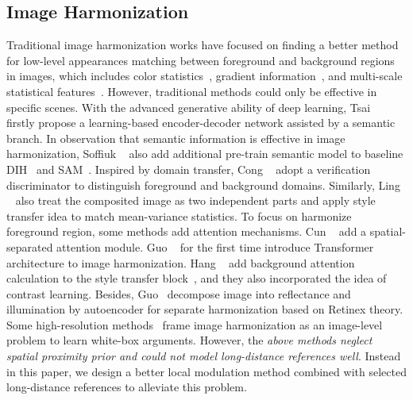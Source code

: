 \documentclass[10pt,twocolumn,letterpaper]{article}
\begin{document}
\subsection{Image Harmonization} Traditional image harmonization works have focused on finding a better method for low-level appearances matching between foreground and background regions in images, which includes color statistics~\cite{reinhard2001color,pitie2007linear,xue2012understanding},  gradient information~\cite{jia2006drag,perez2003poisson,tao2010error}, and multi-scale statistical features~\cite{sunkavalli2010multi,lalonde2007using}. However, traditional methods could only be effective in specific scenes. With the advanced generative ability of deep learning, Tsai \etal~\cite{Tsai_2017_CVPR} firstly propose a learning-based encoder-decoder network assisted by a semantic branch. In observation that semantic information is effective in image harmonization, Soffiuk \etal~\cite{Sofiiuk_2021_WACV} also add additional pre-train semantic model to baseline DIH~\cite{Tsai_2017_CVPR} and SAM~\cite{cun_2020_TIP}. Inspired by domain transfer, Cong \etal~\cite{Cong_2020_CVPR} adopt a verification discriminator to distinguish foreground and background domains. Similarly, Ling \etal~\cite{Ling_2021_CVPR} also treat the composited image as two independent parts and apply style transfer idea to match mean-variance statistics. To focus on harmonize foreground region, some methods add attention mechanisms. Cun \etal~\cite{cun_2020_TIP} add a spatial-separated attention module. Guo \etal~\cite{Guo_2021_ICCV} for the first time introduce Transformer architecture to image harmonization. Hang \etal~\cite{Hang_2022_CVPR} add background attention calculation to the style transfer block~\cite{Ling_2021_CVPR}, and they also incorporated the idea of contrast learning. Besides, Guo\etal~\cite{Guo_2021_CVPR} decompose image into reflectance and illumination by autoencoder for separate harmonization based on Retinex theory. Some high-resolution methods~\cite{Harmonizer,xue2022dccf} frame image harmonization as an image-level problem to learn white-box arguments. However, the \emph{above methods neglect spatial proximity prior and could not model long-distance references well}. Instead in this paper, we design a better local modulation method combined with selected long-distance references to alleviate this problem.
\end{document}
